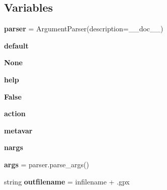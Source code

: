 \subsection*{Variables}
\begin{DoxyCompactItemize}
\item 
\mbox{\label{namespacepymavlink_1_1tools_1_1mavtogpx_aee884cdb38da103bca5341f48d1d015b}} 
{\bfseries parser} = Argument\+Parser(description=\+\_\+\+\_\+doc\+\_\+\+\_\+)
\item 
\mbox{\label{namespacepymavlink_1_1tools_1_1mavtogpx_ac5b99720e8f6855ef8315f9e4bdae561}} 
{\bfseries default}
\item 
\mbox{\label{namespacepymavlink_1_1tools_1_1mavtogpx_ab5db6f213f5a8a527a64975e14900dc8}} 
{\bfseries None}
\item 
\mbox{\label{namespacepymavlink_1_1tools_1_1mavtogpx_a4c8eb575a67b1b5635c4ac22fc712a67}} 
{\bfseries help}
\item 
\mbox{\label{namespacepymavlink_1_1tools_1_1mavtogpx_aa496297c4a07f9ae61ef7a7a82100180}} 
{\bfseries False}
\item 
\mbox{\label{namespacepymavlink_1_1tools_1_1mavtogpx_a5b8088a7b7159e3846832a309ab5a03d}} 
{\bfseries action}
\item 
\mbox{\label{namespacepymavlink_1_1tools_1_1mavtogpx_a30348df9231afcb612b9933aa296e8bb}} 
{\bfseries metavar}
\item 
\mbox{\label{namespacepymavlink_1_1tools_1_1mavtogpx_ad7d5fac4c52f35175d02800faa848299}} 
{\bfseries nargs}
\item 
\mbox{\label{namespacepymavlink_1_1tools_1_1mavtogpx_ac7465ef4c3b1b2e98d64226d60feb554}} 
{\bfseries args} = parser.\+parse\+\_\+args()
\item 
\mbox{\label{namespacepymavlink_1_1tools_1_1mavtogpx_a4916c147b615073bbdb8b018d8dab198}} 
string {\bfseries outfilename} = infilename + \textquotesingle{}.gpx\textquotesingle{}
\end{DoxyCompactItemize}


